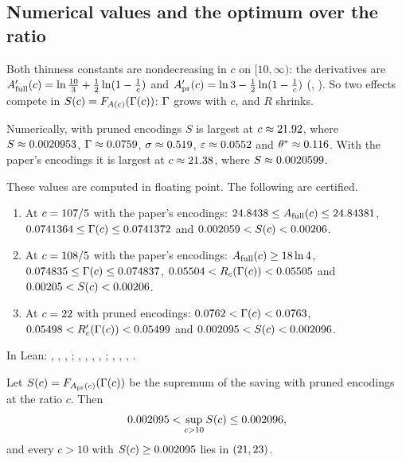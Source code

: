 \subsection{Numerical values and the optimum over the ratio}
\label{sec:numerics}

Both thinness constants are nondecreasing in \(c\) on \([10,\infty)\): the
derivatives are
\(A_{\mathrm{full}}'(c)=\ln\frac{10}{3}+\frac12\ln(1-\frac1c)\) and
\(A_{\mathrm{pr}}'(c)=\ln 3-\frac12\ln(1-\frac1c)\) (,
).  So two effects compete in \(S(c)=F_{A(c)}(\Gamma(c))\): \(\Gamma\) grows with
\(c\), and \(R\) shrinks.

Numerically, with pruned encodings \(S\) is largest at \(c\approx21.92\),
where \(S\approx0.0020953\), \(\Gamma\approx0.0759\),
\(\sigma\approx0.519\), \(\varepsilon\approx0.0552\) and
\(\theta^{*}\approx0.116\).  With the paper's encodings it is largest
at \(c\approx21.38\), where \(S\approx0.0020599\).

These values are computed in floating point.  The following are certified.

\begin{proposition}\label{prop:values}
\begin{enumerate}
\item At \(c=107/5\) with the paper's encodings:
  \(24.8438\le A_{\mathrm{full}}(c)\le24.84381\), \(0.0741364\le\Gamma(c)\le0.0741372\) and
  \(0.002059<S(c)<0.00206\).
\item At \(c=108/5\) with the paper's encodings: \(A_{\mathrm{full}}(c)\ge18\ln4\),
  \(0.074835\le\Gamma(c)\le0.074837\), \(0.05504<R_{c}(\Gamma(c))<0.05505\) and
  \(0.00205<S(c)<0.00206\).
\item At \(c=22\) with pruned encodings: \(0.0762<\Gamma(c)<0.0763\),
  \(0.05498<R'_{c}(\Gamma(c))<0.05499\) and \(0.002095<S(c)<0.002096\).
\end{enumerate}
\end{proposition}

In Lean: , ,
, ; ,
, , ,
; , ,
, .

\begin{theorem}\label{thm:global}
Let \(S(c)=F_{A_{\mathrm{pr}}(c)}(\Gamma(c))\) be the supremum of the saving with pruned
encodings at the ratio \(c\).  Then
\[
  0.002095<\sup_{c>10}S(c)\le0.002096,
\]
and every \(c>10\) with \(S(c)\ge0.002095\) lies in \((21,23)\).
\end{theorem}

